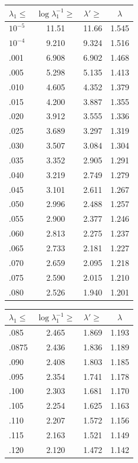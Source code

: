 \documentclass[12pt,psamsfonts]{amsart}
\theoremstyle{definition}
\theoremstyle{remark}
\numberwithin{equation}{section}
\begin{document}
\begin{table}
\begin{tabular}{l|c|c|c} 
$\lambda_1 \leq$ & $\log \lambda_1^{-1} \geq$ & $\lambda' \geq$ & $\lambda$ \\
\hline
 $10^{-5}$ &  11.51 &  11.66 &  1.545 \\ 
 $10^{-4}$ &  9.210 &  9.324 &  1.516 \\ 
 .001 &  6.908 &  6.902 &  1.468 \\ 
 .005 &  5.298 &  5.135 &  1.413 \\ 
 .010 &  4.605 &  4.352 &  1.379 \\ 
 .015 &  4.200 &  3.887 &  1.355 \\ 
 .020 &  3.912 &  3.555 &  1.336 \\ 
 .025 &  3.689 &  3.297 &  1.319 \\ 
 .030 &  3.507 &  3.084 &  1.304 \\ 
 .035 &  3.352 &  2.905 &  1.291 \\ 
 .040 &  3.219 &  2.749 &  1.279 \\ 
 .045 &  3.101 &  2.611 &  1.267 \\ 
 .050 &  2.996 &  2.488 &  1.257 \\ 
 .055 &  2.900 &  2.377 &  1.246 \\ 
 .060 &  2.813 &  2.275 &  1.237 \\ 
 .065 &  2.733 &  2.181 &  1.227 \\ 
 .070 &  2.659 &  2.095 &  1.218 \\ 
 .075 &  2.590 &  2.015 &  1.210 \\ 
 .080 &  2.526 &  1.940 &  1.201 
 \end{tabular}
 \qquad
 \begin{tabular}{l|c|c|c} 
$\lambda_1 \leq$ & $\log \lambda_1^{-1} \geq$ & $\lambda' \geq$ & $\lambda$ \\
\hline
 .085 &  2.465 &  1.869 &  1.193 \\ 
 .0875 &  2.436 &  1.836 &  1.189 \\ 
 .090 &  2.408 &  1.803 &  1.185 \\ 
 .095 &  2.354 &  1.741 &  1.178 \\ 
 .100 &  2.303 &  1.681 &  1.170 \\ 
 .105 &  2.254 &  1.625 &  1.163 \\ 
 .110 &  2.207 &  1.572 &  1.156 \\ 
 .115 &  2.163 &  1.521 &  1.149 \\ 
 .120 &  2.120 &  1.472 &  1.142 \\ 

\end{tabular}
\end{table}
\end{document}

